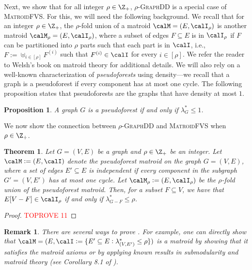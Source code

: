 \documentclass{article}
\newtheorem{proposition}{Proposition}[section]
\newtheorem{remark}{Remark}[section]
\newtheorem{theorem}{Theorem}[section]
\newcommand{\mfvs}{\textsc{MatroidFVS}\xspace}
\newcommand{\densitydeletionset}{\textsc{GraphDD}\xspace}
\newcommand{\rhodensitydeletionset}{\ensuremath{\rho\text{-}}\densitydeletionset\xspace}
\begin{document}
Next, we show that for all integer $\rho \in \Z_+$, \rhodensitydeletionset is a special case of \mfvs. For this, we will need the following background. We recall that for an integer $\rho\in\Z_+$, the $\rho$-fold union of a matroid $\calM = (E, \calI_\rho)$ is another matroid $\calM_\rho = (E, \calI_{\rho})$, where a subset of edges $F\subseteq E$ is in $\calI_{\rho}$ if $F$ can be partitioned into $\rho$ parts such that each part is in $\calI$, i.e., $F := \uplus_{i \in [\rho]} F^{(i)}$ such that $F^{(i)} \in \calI$ for every $i\in [\rho]$. We refer the reader to Welsh's book on matroid theory \cite{Welsh-book} for additional details. 
We will also rely on a well-known characterization of \emph{pseudoforests} using density---we recall that a graph is a pseudoforest if every component has at most one cycle. The following proposition states that pseudoforests are the graphs that have density at most $1$.
\begin{proposition}\cite{chandrasekaran2024polyhedralaspectsfeedbackvertex}\label{prop:psuedoforest-characterization}
    A graph $G$ is a pseudoforest if and only if $\lambda^*_G \leq 1$.
\end{proposition}

We now show the connection between \rhodensitydeletionset and \mfvs when $\rho \in \Z_+$.

\begin{theorem}\label{thm:dds-to-matroidfvs}
    Let $G = (V, E)$ be a graph and $\rho \in \Z_+$ be an integer. 
    Let $\calM := (E, \calI)$ denote the pseudoforest matroid on the graph $G = (V, E)$, where a set of edges $E'\subseteq E$ is independent if every component in the subgraph $G' = (V, E')$ has at most one cycle. Let $\calM_{\rho} := (E, \calI_\rho)$ be the $\rho$-fold union of the pseudoforest matroid. 
    Then, for a subset $F \subseteq V$, we have that $E[V - F] \in \calI_\rho$ if and only if $\lambda^*_{G - F} \leq \rho$.
\end{theorem}
\begin{proof}\textcolor{red}{TOPROVE 11}\end{proof}

\begin{remark}
    There are several ways to prove . For example, one can directly show that $\calM = (E, \calI := \{E'\subseteq E : \lambda^*_{(V, E')} \leq \rho\})$ is a matroid by showing that it satisfies the matroid axioms or by
    applying known results in submodularity and matroid theory (see Corollary 8.1 of \cite{Welsh-book}).
\end{remark} 
\end{document}
